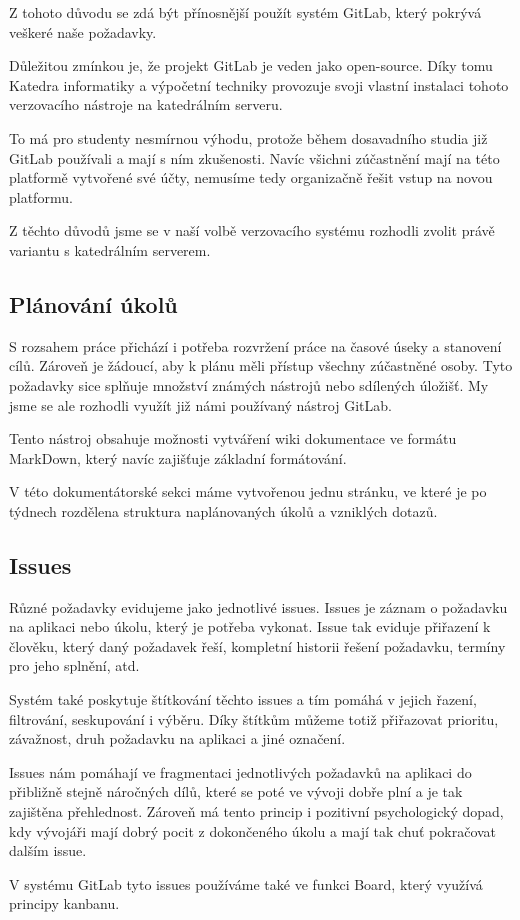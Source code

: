 \documentclass[czech,BP]{thesiskiv}
\begin{document}
	\par Z tohoto důvodu se zdá být přínosnější použít systém GitLab, který pokrývá veškeré naše požadavky. 
	\par Důležitou zmínkou je, že projekt GitLab je veden jako open-source. Díky tomu Katedra informatiky a výpočetní techniky provozuje svoji vlastní instalaci tohoto verzovacího nástroje na katedrálním serveru.
	\par To má pro studenty nesmírnou výhodu, protože během dosavadního studia již GitLab používali a mají s ním zkušenosti. Navíc všichni zúčastnění mají na této platformě vytvořené své účty, nemusíme tedy organizačně řešit vstup na novou platformu.
	\par Z těchto důvodů jsme se v naší volbě verzovacího systému rozhodli zvolit právě variantu s katedrálním serverem.
\subsection{Plánování úkolů}
	\par S rozsahem práce přichází i potřeba rozvržení práce na časové úseky a stanovení cílů. Zároveň je žádoucí, aby k plánu měli přístup všechny zúčastněné osoby. Tyto požadavky sice splňuje množství známých nástrojů nebo sdílených úložišť. My jsme se ale rozhodli využít již námi používaný nástroj GitLab.
	\par Tento nástroj obsahuje možnosti vytváření wiki dokumentace ve formátu MarkDown, který navíc zajišťuje základní formátování.
	\par V této dokumentátorské sekci máme vytvořenou jednu stránku, ve které je po týdnech rozdělena struktura naplánovaných úkolů a vzniklých dotazů.
\subsection{Issues}
	\par Různé požadavky evidujeme jako jednotlivé issues. Issues je záznam o požadavku na aplikaci nebo úkolu, který je potřeba vykonat. Issue tak eviduje přiřazení k člověku, který daný požadavek řeší, kompletní historii řešení požadavku, termíny pro jeho splnění, atd.
	\par Systém také poskytuje štítkování těchto issues a tím pomáhá v jejich řazení, filtrování, seskupování i výběru. Díky štítkům můžeme totiž přiřazovat prioritu, závažnost, druh požadavku na aplikaci a jiné označení.
	\par Issues nám pomáhají ve fragmentaci  jednotlivých požadavků na aplikaci do přibližně stejně náročných dílů, které se poté ve vývoji dobře plní a je tak zajištěna přehlednost. Zároveň má tento princip i pozitivní psychologický dopad, kdy vývojáři mají dobrý pocit z dokončeného úkolu a mají tak chuť pokračovat dalším issue.
	\par V systému GitLab tyto issues používáme také ve funkci Board, který využívá principy kanbanu.
\end{document}
